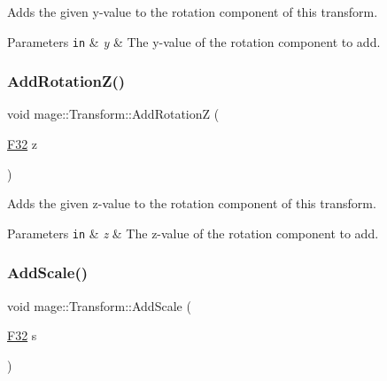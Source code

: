 Adds the given y-\/value to the rotation component of this transform.


\begin{DoxyParams}[1]{Parameters}
\mbox{\tt in}  & {\em y} & The y-\/value of the rotation component to add. \\
\hline
\end{DoxyParams}
\hypertarget{classmage_1_1_transform_a973e713992328de9f5ad3b6ed4779f40}{}\label{classmage_1_1_transform_a973e713992328de9f5ad3b6ed4779f40} 
\subsubsection{\texorpdfstring{Add\+Rotation\+Z()}{AddRotationZ()}}
{\footnotesize\ttfamily void mage\+::\+Transform\+::\+Add\+RotationZ (\begin{DoxyParamCaption}\item[{\hyperlink{namespacemage_aa97e833b45f06d60a0a9c4fc22ae02c0}{F32}}]{z }\end{DoxyParamCaption})\hspace{0.3cm}{\ttfamily [noexcept]}}

Adds the given z-\/value to the rotation component of this transform.


\begin{DoxyParams}[1]{Parameters}
\mbox{\tt in}  & {\em z} & The z-\/value of the rotation component to add. \\
\hline
\end{DoxyParams}
\hypertarget{classmage_1_1_transform_a3b90baf1db39dd3dc17a9203b4383073}{}\label{classmage_1_1_transform_a3b90baf1db39dd3dc17a9203b4383073} 
\subsubsection{\texorpdfstring{Add\+Scale()}{AddScale()}\hspace{0.1cm}{\footnotesize\ttfamily [1/4]}}
{\footnotesize\ttfamily void mage\+::\+Transform\+::\+Add\+Scale (\begin{DoxyParamCaption}\item[{\hyperlink{namespacemage_aa97e833b45f06d60a0a9c4fc22ae02c0}{F32}}]{s }\end{DoxyParamCaption})\hspace{0.3cm}{\ttfamily [noexcept]}}

